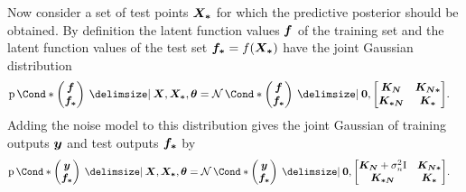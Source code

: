 Now consider a set of test points $\bm{X_\ast}$ for which the predictive posterior should be obtained.
By definition the latent function values $\bm{f}$ of the training set and the latent function values of the test set $\bm{f_\ast} = f(\bm{X_\ast})$ have the joint Gaussian distribution
\begin{align}
    \Prob*{\begin{pmatrix}
        \mat{f} \\
        \mat{f_\ast}
    \end{pmatrix} \given \mat{X}, \mat{X_\ast}, \mat{\theta}} &= \Gaussian*{\begin{pmatrix}
        \mat{f} \\
        \mat{f_\ast}
    \end{pmatrix} \given \mat{0}, \begin{bmatrix}
        \mat{K_N} & \mat{K_{N\ast}} \\
        \mat{K_{\ast N}} & \mat{K_{\ast}}
    \end{bmatrix}}.
\end{align}
Adding the noise model to this distribution gives the joint Gaussian of training outputs $\bm{y}$ and test outputs $\bm{f_\ast}$ by
\begin{align}
    \Prob*{\begin{pmatrix}
        \mat{y} \\
        \mat{f_\ast}
    \end{pmatrix} \given \mat{X}, \mat{X_\ast}, \mat{\theta}} &= \Gaussian*{\begin{pmatrix}
        \mat{y} \\
        \mat{f_\ast}
    \end{pmatrix} \given \mat{0}, \begin{bmatrix}
        \mat{K_N} + \sigma_n^2 \Eye & \mat{K_{N\ast}} \\
        \mat{K_{\ast N}} & \mat{K_{\ast}}
    \end{bmatrix}}.
\end{align}

